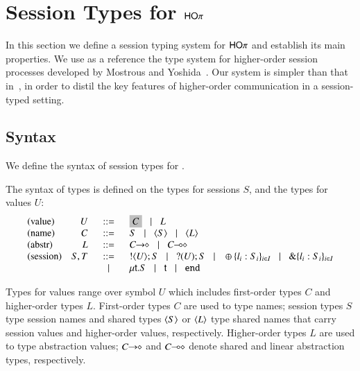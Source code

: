 \section{Session Types for $\mathsf{HO}\pi$}
\label{sec:types}

In this section we define a session typing system for
$\mathsf{HO}\pi$ and establish its main properties. We use as
a reference the type system for higher-order session processes 
developed by Mostrous and Yoshida~\cite{tlca07,mostrous09sessionbased,MostrousY15}.
Our system is simpler than that in~\cite{tlca07}, in order to distil the key
features of higher-order communication in a session-typed setting.


\subsection{Syntax}

We define the syntax of session types for \HOp.

\begin{definition}\myrm
	\label{def:types}
	The syntax of types is defined on the types for sessions $S$,
	and the types for values $U$:
	\[
	\begin{array}{lrcl}
		\textrm{(value)} & U & \bnfis &		\nonhosyntax{C}  \bnfbar L 
		\\

		\textrm{(name)} & C & \bnfis &	S \bnfbar \chtype{S} \bnfbar \chtype{L}
		\\

		\textrm{(abstr)} & L & \bnfis &	\shot{C} \bnfbar \lhot{C}
		\\

		\textrm{(session)} & S,T & \bnfis & 	\btout{U} S \bnfbar \btinp{U} S
							\bnfbar \btsel{l_i:S_i}_{i \in I} \bnfbar \btbra{l_i:S_i}_{i \in I}\\
					&&\bnfbar&	\trec{t}{S} \bnfbar \vart{t}  \bnfbar \tinact
	\end{array}
	\]
\end{definition}
%
\noi {}
Types for values range over symbol $U$ which includes
first-order types $C$ and higher-order types $L$.
First-order types $C$ are used to type names;
session types $S$ type session names and shared types
$\langle S \rangle$ or $\langle L \rangle$ type shared names that
carry session values and higher-order values, respectively.
Higher-order types $L$ are used to type abstraction values;
$C\!\! \rightarrow\!\! \diamond$ and $C\!\! \multimap\!\! \diamond$ denote
shared and linear abstraction types, respectively.

